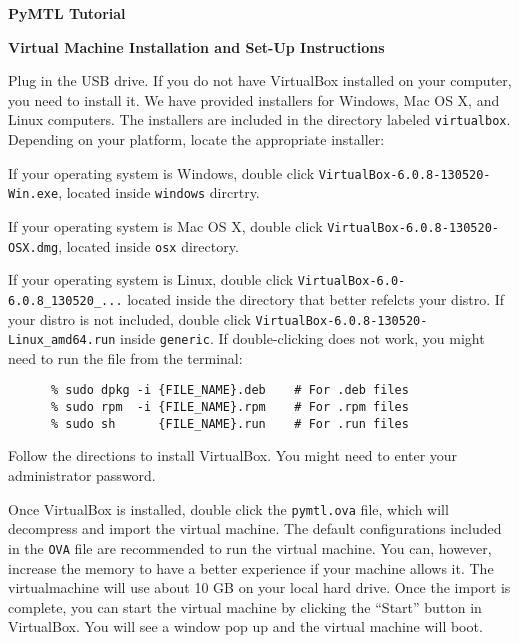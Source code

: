 \documentclass[11pt]{article}
\newenvironment{cbxlist}
{%
  \begin{list}{\textbullet}
  {%
    \setlength{\leftmargin}{1.5em}
    \setlength{\rightmargin}{0em}
    \setlength{\topsep}{0.05in}
    \setlength{\parsep}{0pt}
    \setlength{\listparindent}{0pt}
    \setlength{\itemsep}{0.5em}
  }
}{%
  \end{list}
}
\begin{document}
\pagestyle{empty}

\begin{center}

  {\LARGE\textbf{PyMTL Tutorial}}

  \vspace{0.05in}
  {\LARGE\textbf{Virtual Machine Installation and Set-Up Instructions}}

\end{center}

\vspace{0.1in}
Plug in the USB drive. If you do not have VirtualBox installed on your
computer, you need to install it. We have provided installers for Windows,
Mac OS X, and Linux computers. The installers are included in the directory
labeled \texttt{virtualbox}. Depending on your platform, locate the
appropriate installer:

\begin{cbxlist}

  \item If your operating system is Windows, double click
  \texttt{VirtualBox-6.0.8-130520-Win.exe}, located inside \texttt{windows}
  dircrtry.
  \item If your operating system is Mac OS X, double click
  \texttt{VirtualBox-6.0.8-130520-OSX.dmg}, located inside \texttt{osx}
  directory.
  \item If your operating system is Linux, double click
    \texttt{VirtualBox-6.0-6.0.8\_130520\_...} located inside
    the directory that better refelcts your distro. If your distro is not
    included, double click
    \texttt{VirtualBox-6.0.8-130520-Linux\_amd64.run} inside \texttt{generic}.
    If double-clicking does not work, you might need to run the file from
    the terminal:

    \begin{verbatim}
      % sudo dpkg -i {FILE_NAME}.deb    # For .deb files
      % sudo rpm  -i {FILE_NAME}.rpm    # For .rpm files
      % sudo sh      {FILE_NAME}.run    # For .run files
    \end{verbatim}

\end{cbxlist}
\vspace{-0.15in}

Follow the directions to install VirtualBox. You might need to enter your
administrator password.

Once VirtualBox is installed, double click the \texttt{pymtl.ova}
file, which will decompress and import the virtual machine. The default
configurations included in the \texttt{OVA} file are recommended to run
the virtual machine. You can, however, increase the memory to have a better
experience if your machine allows it. The virtualmachine will use
about 10 GB on your local hard drive. Once the import is complete, you
can start the virtual machine by clicking the ``Start'' button in
VirtualBox. You will see a window pop up and the virtual machine will boot.
\end{document}
